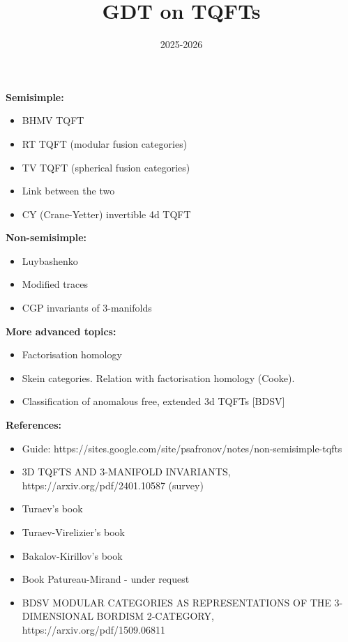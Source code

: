 \documentclass{article}
\title{GDT on TQFTs}
\date{2025-2026}
\begin{document}
\textbf{Semisimple:}

\begin{itemize}
\item BHMV TQFT
\item RT TQFT (modular fusion categories)
\item TV TQFT (spherical fusion categories)
\item Link between the two 
\item CY (Crane-Yetter) invertible 4d TQFT
\end{itemize}




\textbf{Non-semisimple:}


\begin{itemize}
\item Luybashenko
\item  Modified traces
\item CGP invariants of 3-manifolds
\end{itemize}




\textbf{More advanced topics:}


\begin{itemize}
\item Factorisation homology
\item Skein categories. Relation with factorisation homology (Cooke).
\item Classification of anomalous free, extended 3d TQFTs [BDSV]
\end{itemize}


\textbf{References:}


\begin{itemize}
\item Guide: https://sites.google.com/site/psafronov/notes/non-semisimple-tqfts
\item  3D TQFTS AND 3-MANIFOLD INVARIANTS, https://arxiv.org/pdf/2401.10587 (survey)
\item Turaev's book
\item Turaev-Virelizier's book
\item Bakalov-Kirillov's book
\item Book Patureau-Mirand - under request
\item BDSV MODULAR CATEGORIES AS REPRESENTATIONS OF THE 3-DIMENSIONAL BORDISM 2-CATEGORY, https://arxiv.org/pdf/1509.06811
\end{itemize}


\newpage

\maketitle
\end{document}
